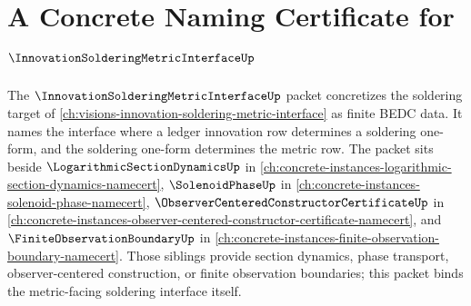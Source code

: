 \chapter{A Concrete Naming Certificate for $\InnovationSolderingMetricInterfaceUp$}
\label{ch:concrete-instances-innovation-soldering-metric-interface-namecert}

The $\InnovationSolderingMetricInterfaceUp$ packet concretizes the soldering target of \autoref{ch:visions-innovation-soldering-metric-interface} as finite BEDC data. It names the interface where a ledger innovation row determines a soldering one-form, and the soldering one-form determines the metric row. The packet sits beside $\LogarithmicSectionDynamicsUp$ in \autoref{ch:concrete-instances-logarithmic-section-dynamics-namecert}, $\SolenoidPhaseUp$ in \autoref{ch:concrete-instances-solenoid-phase-namecert}, $\ObserverCenteredConstructorCertificateUp$ in \autoref{ch:concrete-instances-observer-centered-constructor-certificate-namecert}, and $\FiniteObservationBoundaryUp$ in \autoref{ch:concrete-instances-finite-observation-boundary-namecert}. Those siblings provide section dynamics, phase transport, observer-centered construction, or finite observation boundaries; this packet binds the metric-facing soldering interface itself.


